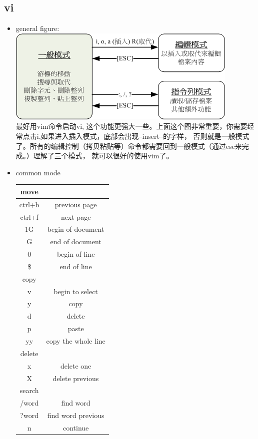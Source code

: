 \documentclass[a4paper,12pt,twoside]{book}
\begin{document}
\begin{CJK*}{UTF8}{song}
\section{vi}
	\begin{itemize}
	\item general figure: \\
	\includegraphics[scale=0.6]{pics/vi-mode} \\
最好用vim命令启动vi, 这个功能更强大一些。上面这个图非常重要，你需要经常点击i,如果进入插入模式，底部会出现--insert--的字样，
否则就是一般模式了。所有的编辑控制（拷贝粘贴等）命令都需要回到一般模式（通过esc来完成。）理解了三个模式， 就可以很好的使用vim了。
	\item common mode \\
	\begin{center}
		\begin{tabular}{c|c}
		\hline
		move & \\
		\hline ctrl+b & previous page\\
		ctrl+f & next page\\
		1G &  begin of document\\
		G & end of document\\
		0& begin of line \\
		\$ & end of line \\
		\hline
		copy & \\
		\hline v & begin to select\\
		y & copy\\
		d & delete\\
		p & paste \\
		yy & copy the whole line \\
		\hline
		delete & \\
		\hline x & delete one\\
		X & delete previous\\
		\hline
		search & \\
		\hline /word & find word\\
		?word & find word previous\\
		n & continue\\

\end{tabular}
\end{center}
\end{itemize}
\end{CJK*}
\end{document}
